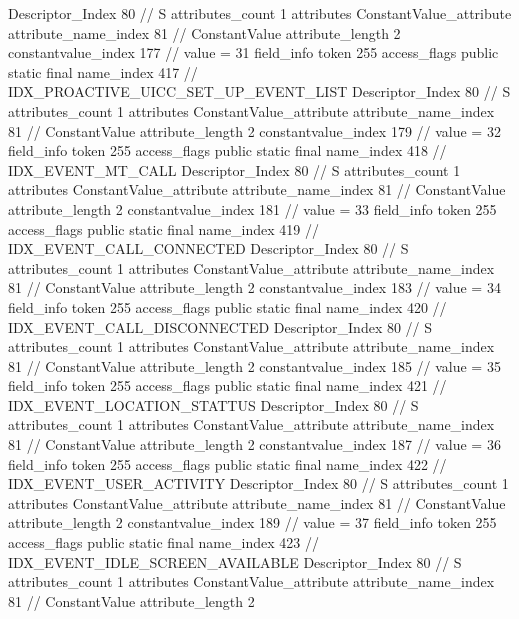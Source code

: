 {{{{{				Descriptor_Index	80		// S
				attributes_count	1
				attributes {
				ConstantValue_attribute {
					attribute_name_index	81		// ConstantValue
					attribute_length	2
					constantvalue_index	177		// value = 31
				}
				}
			}
			field_info {
				token	255
				access_flags	public static final
				name_index	417		// IDX_PROACTIVE_UICC_SET_UP_EVENT_LIST
				Descriptor_Index	80		// S
				attributes_count	1
				attributes {
				ConstantValue_attribute {
					attribute_name_index	81		// ConstantValue
					attribute_length	2
					constantvalue_index	179		// value = 32
				}
				}
			}
			field_info {
				token	255
				access_flags	public static final
				name_index	418		// IDX_EVENT_MT_CALL
				Descriptor_Index	80		// S
				attributes_count	1
				attributes {
				ConstantValue_attribute {
					attribute_name_index	81		// ConstantValue
					attribute_length	2
					constantvalue_index	181		// value = 33
				}
				}
			}
			field_info {
				token	255
				access_flags	public static final
				name_index	419		// IDX_EVENT_CALL_CONNECTED
				Descriptor_Index	80		// S
				attributes_count	1
				attributes {
				ConstantValue_attribute {
					attribute_name_index	81		// ConstantValue
					attribute_length	2
					constantvalue_index	183		// value = 34
				}
				}
			}
			field_info {
				token	255
				access_flags	public static final
				name_index	420		// IDX_EVENT_CALL_DISCONNECTED
				Descriptor_Index	80		// S
				attributes_count	1
				attributes {
				ConstantValue_attribute {
					attribute_name_index	81		// ConstantValue
					attribute_length	2
					constantvalue_index	185		// value = 35
				}
				}
			}
			field_info {
				token	255
				access_flags	public static final
				name_index	421		// IDX_EVENT_LOCATION_STATTUS
				Descriptor_Index	80		// S
				attributes_count	1
				attributes {
				ConstantValue_attribute {
					attribute_name_index	81		// ConstantValue
					attribute_length	2
					constantvalue_index	187		// value = 36
				}
				}
			}
			field_info {
				token	255
				access_flags	public static final
				name_index	422		// IDX_EVENT_USER_ACTIVITY
				Descriptor_Index	80		// S
				attributes_count	1
				attributes {
				ConstantValue_attribute {
					attribute_name_index	81		// ConstantValue
					attribute_length	2
					constantvalue_index	189		// value = 37
				}
				}
			}
			field_info {
				token	255
				access_flags	public static final
				name_index	423		// IDX_EVENT_IDLE_SCREEN_AVAILABLE
				Descriptor_Index	80		// S
				attributes_count	1
				attributes {
				ConstantValue_attribute {
					attribute_name_index	81		// ConstantValue
					attribute_length	2
}}}}}}}
